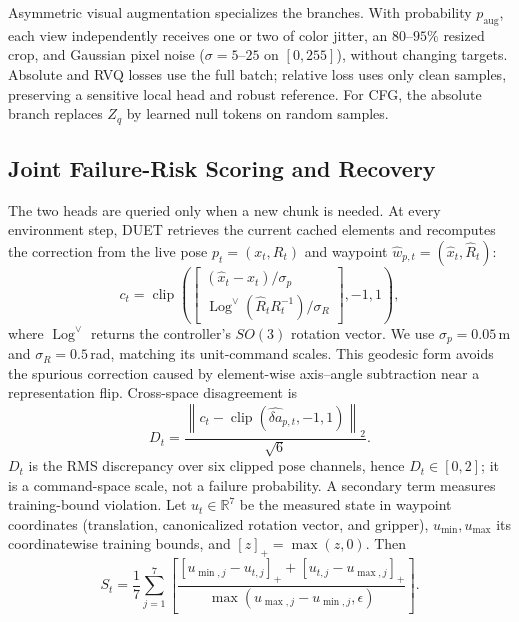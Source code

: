 \documentclass[letterpaper, 10 pt, conference]{ieeeconf}
\begin{document}
Asymmetric visual augmentation specializes the branches. With probability $p_{\mathrm{aug}}$, each view independently receives one or two of color jitter, an $80$--$95\%$ resized crop, and Gaussian pixel noise ($\sigma{=}5$--$25$ on $[0,255]$), without changing targets. Absolute and RVQ losses use the full batch; relative loss uses only clean samples, preserving a sensitive local head and robust reference. For CFG, the absolute branch replaces $Z_q$ by learned null tokens on random samples.

\subsection{Joint Failure-Risk Scoring and Recovery}
\label{sec:method-gate}
The two heads are queried only when a new chunk is needed. At every environment step, DUET retrieves the current cached elements and recomputes the correction from the live pose $p_t=(x_t,R_t)$ and waypoint $\hat{w}_{p,t}=(\hat{x}_t,\hat{R}_t)$:
\begin{equation}
    c_t=\operatorname{clip}\!\left(
    \begin{bmatrix}
    (\hat{x}_t-x_t)/\sigma_p \\
    \operatorname{Log}^{\vee}(\hat{R}_tR_t^{-1})/\sigma_R
    \end{bmatrix},-1,1\right),
    \label{eq:recovery_vector}
\end{equation}
where $\operatorname{Log}^{\vee}$ returns the controller's $SO(3)$ rotation vector. We use $\sigma_p{=}0.05$\,m and $\sigma_R{=}0.5$\,rad, matching its unit-command scales. This geodesic form avoids the spurious correction caused by element-wise axis--angle subtraction near a representation flip. Cross-space disagreement is
\begin{equation}
    D_t=\frac{\left\|c_t-
    \operatorname{clip}(\hat{\delta a}_{p,t},-1,1)\right\|_2}{\sqrt{6}}.
    \label{eq:disagreement}
\end{equation}
$D_t$ is the RMS discrepancy over six clipped pose channels, hence $D_t\in[0,2]$; it is a command-space scale, not a failure probability. A secondary term measures training-bound violation. Let $u_t\in\mathbb{R}^7$ be the measured state in waypoint coordinates (translation, canonicalized rotation vector, and gripper), $u_{\min},u_{\max}$ its coordinatewise training bounds, and $[z]_+=\max(z,0)$. Then
\begin{equation}
    S_t =
    \frac{1}{7}\sum_{j=1}^{7}\left[
    \frac{[u_{\min,j}-u_{t,j}]_+ + [u_{t,j}-u_{\max,j}]_+}
    {\max(u_{\max,j}-u_{\min,j},\epsilon)}
    \right].
\end{equation}
\end{document}
